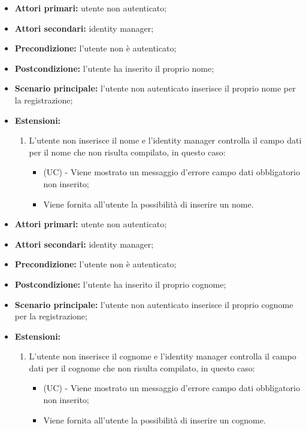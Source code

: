 \begin{itemize}
	\item \textbf{Attori primari:} utente non autenticato;
	\item \textbf{Attori secondari:} identity manager;
	\item \textbf{Precondizione:} l'utente non è autenticato;
	\item \textbf{Postcondizione:} l'utente ha inserito il proprio nome;
	\item \textbf{Scenario principale:} l'utente non autenticato inserisce il proprio nome per la registrazione;
	\item \textbf{Estensioni:}
	\begin{enumerate}
		\item L'utente non inserisce il nome e l'identity manager controlla il campo dati per il nome che non risulta compilato, in questo caso:
		\begin{itemize}
			\item (UC) - Viene mostrato un messaggio d'errore campo dati obbligatorio non inserito;
			\item Viene fornita all'utente la possibilità di inserire un nome.
		\end{itemize}
	\end{enumerate} 
\end{itemize}

\begin{itemize}
	\item \textbf{Attori primari:} utente non autenticato;
	\item \textbf{Attori secondari:} identity manager;
	\item \textbf{Precondizione:} l'utente non è autenticato;
	\item \textbf{Postcondizione:} l'utente ha inserito il proprio cognome;
	\item \textbf{Scenario principale:} l'utente non autenticato inserisce il proprio cognome per la registrazione;
	\item \textbf{Estensioni:} 
	\begin{enumerate}
		\item L'utente non inserisce il cognome e l'identity manager controlla il campo dati per il cognome che non risulta compilato, in questo caso:
		\begin{itemize}
			\item (UC) - Viene mostrato un messaggio d'errore campo dati obbligatorio non inserito;
			\item Viene fornita all'utente la possibilità di inserire un cognome.
		\end{itemize}
	\end{enumerate}
\end{itemize}

